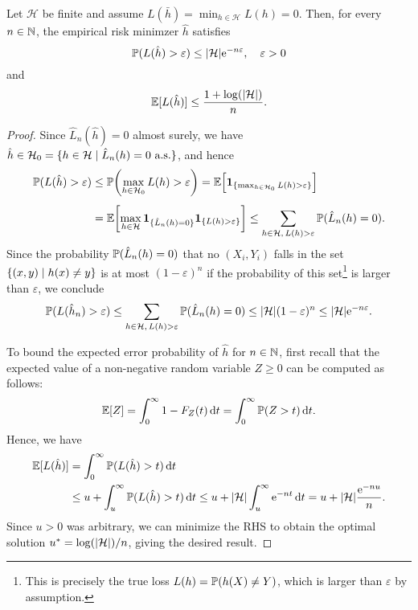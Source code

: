 \begin{theorem}
Let $\mathcal{H}$ be finite and assume $L(\bar{h}) = \min_{h \in \mathcal{H}} L(h) = 0$. Then, for every $n \in \mathbb{N}$, the empirical risk minimzer $\hat{h}$ satisfies
\[
    \operatorname{\mathbb{P}}(L(\hat{h}) > \varepsilon) \leq \abs{\mathcal{H}} \mathrm{e}^{-n \varepsilon}, \quad \varepsilon > 0
\]
and
\[
    \operatorname{\mathbb{E}}[L(\hat{h})] \leq \frac{1 + \log(\abs{\mathcal{H}})}{n}.
\]
\end{theorem}

\begin{proof}
Since $\hat{L}_n(\hat{h}) = 0$ almost surely, we have $\hat{h} \in \mathcal{H}_0 = \{h \in \mathcal{H} \mathrel{|} \hat L_n(h) = 0 \text{ a.s.}\}$, and hence
\begin{align*}
    \Prob(L(\hat{h}) > \varepsilon) &\leq \Prob\left(\max_{h \in \mathcal{H}_0} L(h) > \varepsilon\right) = \Exp\left[\ind{\{\max_{h \in \mathcal{H}_0} L(h) > \varepsilon\}}\right] \\[4pt]
    &=\Exp\left[\max_{h \in \mathcal{H}} \ind{\{\hat{L}_n(h) = 0\}} \indSet{L(h) > \varepsilon}\right] \leq \sum_{h \in \mathcal{H}, \, L(h) > \varepsilon} \Prob(\hat{L}_n(h) = 0).
\end{align*}
Since the probability $\operatorname{\mathbb{P}}(\hat{L}_n(h) = 0)$ that no $(X_i, Y_i)$ falls in the set $\set{(x, y) \with h(x) \neq y}$ is at most $(1 - \varepsilon)^n$ if the probability of this set\footnote{This is precisely the true loss $L(h) = \operatorname{\mathbb{P}}(h(X) \neq Y)$, which is larger than $\varepsilon$ by assumption.} is larger than $\varepsilon$, we conclude
\[
    \operatorname{\mathbb{P}}(L(\hat{h}_n) > \varepsilon) \leq \sum_{h \in \mathcal{H}, \, L(h) > \varepsilon} \operatorname{\mathbb{P}}(\hat{L}_n(h) = 0) \leq \abs{\mathcal{H}} (1 - \varepsilon)^n \leq \abs{\mathcal{H}} \mathrm{e}^{-n \varepsilon}.
\]

To bound the expected error probability of $\hat{h}$ for $n \in \mathbb{N}$, first recall that the expected value of a non-negative random variable $Z \geq 0$ can be computed as follows:
\[
    \operatorname{\mathbb{E}}[Z] = \int_0^{\infty} 1 - F_Z(t) \, \mathrm{d}t = \int_0^{\infty} \operatorname{\mathbb{P}}(Z > t) \, \mathrm{d}t.
\]
Hence, we have
\begin{align*}
    \operatorname{\mathbb{E}}[L(\hat{h})] &= \int_0^{\infty} \operatorname{\mathbb{P}}(L(\hat{h}) > t) \, \mathrm{d}t \\
    &\leq u + \int_u^{\infty} \operatorname{\mathbb{P}}(L(\hat{h}) > t) \, \mathrm{d}t \leq u + \abs{\mathcal{H}} \int_u^{\infty} \mathrm{e}^{-nt} \, \mathrm{d}t = u + \abs{\mathcal{H}} \frac{\mathrm{e}^{-nu}}{n}.
\end{align*}
Since $u > 0$ was arbitrary, we can minimize the RHS to obtain the optimal solution $u^* = \log(\abs{\mathcal{H}}) / n$, giving the desired result.
\end{proof}
